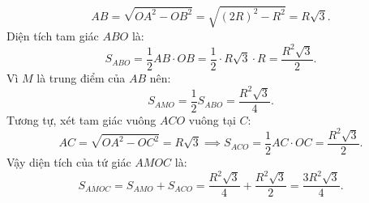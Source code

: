 \begin{bt}
{\begin{enumerate}[a)]
		$$AB = \sqrt{OA^2 - OB^2} = \sqrt{(2R)^2 - R^2} = R\sqrt{3}.$$
		Diện tích tam giác $ABO$ là:
		$$S_{ABO} = \frac{1}{2} AB \cdot OB = \frac{1}{2} \cdot R\sqrt{3} \cdot R = \frac{R^2\sqrt{3}}{2}.$$
		Vì $M$ là trung điểm của $AB$ nên:
		$$S_{AMO} = \frac{1}{2} S_{ABO} = \frac{R^2\sqrt{3}}{4}.$$
		Tương tự, xét tam giác vuông $ACO$ vuông tại $C$:
		$$AC = \sqrt{OA^2 - OC^2} = R\sqrt{3} \implies S_{ACO} = \frac{1}{2} AC \cdot OC = \frac{R^2\sqrt{3}}{2}.$$
		Vậy diện tích của tứ giác $AMOC$ là:
		$$S_{AMOC} = S_{AMO} + S_{ACO} = \frac{R^2\sqrt{3}}{4} + \frac{R^2\sqrt{3}}{2} = \frac{3R^2\sqrt{3}}{4}.$$
	\end{enumerate}
}
\end{bt}


